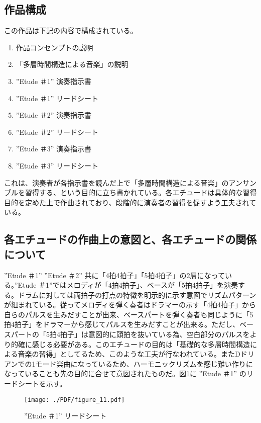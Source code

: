 \documentclass[uplatex,dvipdfmx]{ujarticle}
\begin{document}
\subsection{作品構成}

この作品は下記の内容で構成されている。

\begin{enumerate}
  \item 作品コンセンプトの説明
  \item 「多層時間構造による音楽」の説明
	\item ''Etude ＃1'' 演奏指示書
	\item ''Etude ＃1'' リードシート
	\item ''Etude ＃2'' 演奏指示書
	\item ''Etude ＃2'' リードシート
	\item ''Etude ＃3'' 演奏指示書
	\item ''Etude ＃3'' リードシート
\end{enumerate}

これは、演奏者が各指示書を読んだ上で「多層時間構造による音楽」のアンサンブルを習得する、という目的に立ち書かれている。各エチュードは具体的な習得目的を定めた上で作曲されており、段階的に演奏者の習得を促すよう工夫されている。

\subsection{各エチュードの作曲上の意図と、各エチュードの関係について}

''Etude ＃1'' ''Etude ＃2'' 共に「4拍4拍子」「5拍4拍子」の2層になっている。''Etude ＃1''ではメロディが「4拍4拍子」、ベースが「5拍4拍子」を演奏する。ドラムに対しては両拍子の打点の特徴を明示的に示す意図でリズムパターンが組まれている。従ってメロディを弾く奏者はドラマーの示す「4拍4拍子」から自らのパルスを生みだすことが出来、ベースパートを弾く奏者も同じように「5拍4拍子」をドラマーから感じてパルスを生みだすことが出来る。ただし、ベースパートの「5拍4拍子」は意図的に頭拍を抜いている為、空白部分のパルスをより的確に感じる必要がある。このエチュードの目的は「基礎的な多層時間構造による音楽の習得」としてるため、このような工夫が行なわれている。またDドリアンでの1モード楽曲になっているため、ハーモニックリズムを感じ難い作りになっていることも先の目的に合せて意図されたものだ。図\ref{fig:figure_11}に ''Etude ＃1'' のリードシートを示す。

\begin{figure}[htb]
\centerline{
	\texttt{[image: ./PDF/figure\_11.pdf]}
}
\caption{''Etude ＃1'' リードシート}
\label{fig:figure_11}
\end{figure}
\end{document}
